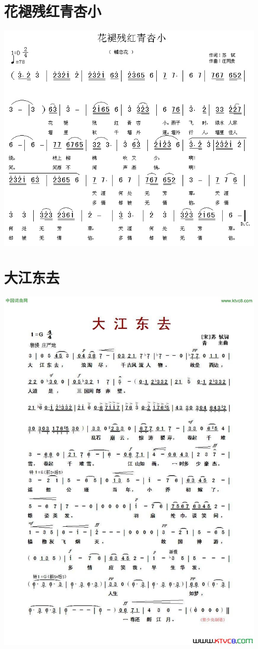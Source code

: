 \documentclass[cn,pad,twocol]{elegantbook}
\begin{document}
\section{花褪残红青杏小}
    \includegraphics[width=\textwidth]{dongxiao/20200801-苏轼-花褪残红青杏小} 
\section{大江东去}
    \includegraphics[width=\textwidth]{rpi400/20201230大江东去.jpg}
\end{document}
